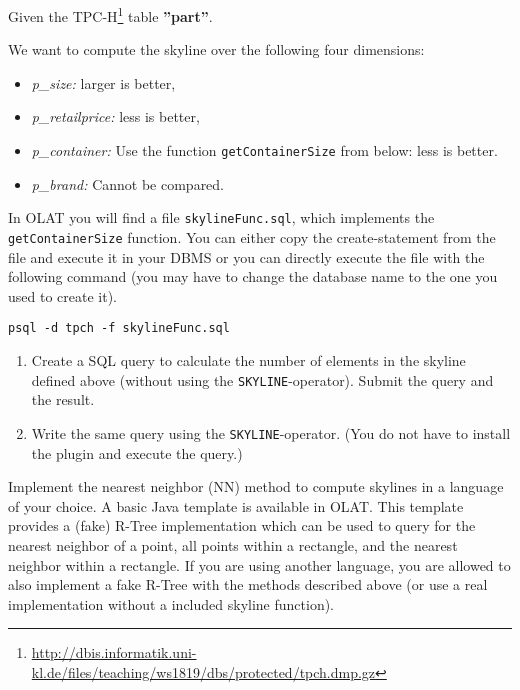 


\newcommand{\subtitle}{\textbf{Exercise 9}}
\newcommand{\outdate}{08.01.2024}
\newcommand{\duedate}{15.01.2024 12:00 MEZ}
\newcommand{\video}{049}






Given the TPC-H\footnote{\url{http://dbis.informatik.uni-kl.de/files/teaching/ws1819/dbs/protected/tpch.dmp.gz}} table \textbf{''part''}.

We want to compute the skyline over the following four dimensions:
\begin{itemize}
\item \emph{p\_size:} larger is better,
\item \emph{p\_retailprice:} less is better,
\item \emph{p\_container:} Use the function \texttt{getContainerSize} from below: less is better.
\item \emph{p\_brand:} Cannot be compared.
\end{itemize}

In OLAT you will find a file \texttt{skylineFunc.sql}, which implements the \texttt{getContainerSize} function.
You can either copy the create-statement from the file and execute it in your DBMS or you can directly execute the file with the following command (you may have to change the database name to the one you used to create it).
\begin{verbatim}
psql -d tpch -f skylineFunc.sql
\end{verbatim} 

\begin{enumerate}
\item Create a SQL query to calculate the number of elements in the skyline defined above (without using the \verb+SKYLINE+-operator).
Submit the query and the result.

\item Write the same query using the \verb+SKYLINE+-operator. (You do not have to install the plugin and execute the query.)

\end{enumerate}


Implement the nearest neighbor (NN) method to compute skylines in a language of your choice. A basic Java template is available in OLAT.
This template provides a (fake) R-Tree implementation which can be used to query for the nearest neighbor of a point, all points within a rectangle, and the nearest neighbor within a rectangle.
If you are using another language, you are allowed to also implement a fake R-Tree with the methods described above (or use a real implementation without a included skyline function).

